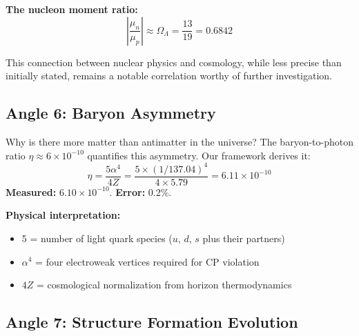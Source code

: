 \documentclass[11pt,a4paper]{article}
\theoremstyle{plain}
\theoremstyle{definition}
\theoremstyle{remark}
\newcommand{\OmegaL}{\Omega_\Lambda}
\begin{document}
\textbf{The nucleon moment ratio:}
\[
\left|\frac{\mu_n}{\mu_p}\right| \approx \OmegaL = \frac{13}{19} = 0.6842
\]

\begin{center}
\end{center}

This connection between nuclear physics and cosmology, while less precise than initially stated, remains a notable correlation worthy of further investigation.

\subsection{Angle 6: Baryon Asymmetry}

Why is there more matter than antimatter in the universe? The baryon-to-photon ratio $\eta \approx 6 \times 10^{-10}$ quantifies this asymmetry. Our framework derives it:
\[
\eta = \frac{5\alpha^4}{4Z} = \frac{5 \times (1/137.04)^4}{4 \times 5.79} = 6.11 \times 10^{-10}
\]
\textbf{Measured:} $6.10 \times 10^{-10}$. \textbf{Error:} 0.2\%.

\textbf{Physical interpretation:}
\begin{itemize}
  \item 5 = number of light quark species ($u$, $d$, $s$ plus their partners)
  \item $\alpha^4$ = four electroweak vertices required for CP violation
  \item $4Z$ = cosmological normalization from horizon thermodynamics
\end{itemize}

\subsection{Angle 7: Structure Formation Evolution}
\end{document}
